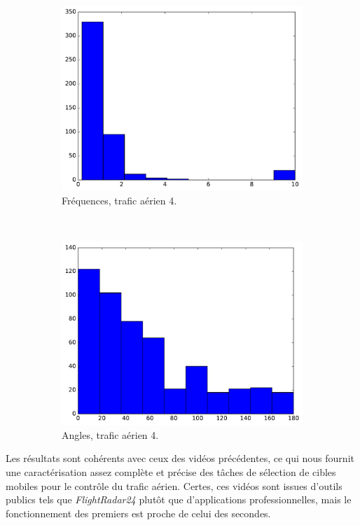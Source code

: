 \begin{figure}[!htbp]
\begin{subfigure}[t]{\subImgWclicks}
			\includegraphics[width=\textwidth]{figures/ch3/flightradar2a_frequency}
			\caption{Fréquences, trafic aérien 4.}
			\label{fig:flightradar2a_frequency}
		\end{subfigure}
		~
		\begin{subfigure}[t]{\subImgWclicks}
			\centering
			\includegraphics[width=\textwidth]{figures/ch3/flightradar2a_angle}
			\caption{Angles, trafic aérien 4.}
			\label{fig:flightradar2a_angle}
		\end{subfigure}
		\caption[Histogrammes, contrôle du trafic aérien, bis]{}
		\label{fig:histAirControl34}
	\end{figure}
	
	Les résultats sont cohérents avec ceux des vidéos précédentes, ce qui nous fournit une caractérisation assez complète et précise des tâches de sélection de cibles mobiles pour le contrôle du trafic aérien. Certes, ces vidéos sont issues d'outils publics tels que \emph{FlightRadar24} plutôt que d'applications professionnelles, mais le fonctionnement des premiers est proche de celui des secondes.
	
